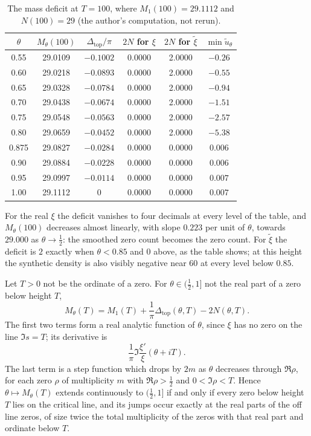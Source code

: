 \begin{table}[h]
\centering
\small
\begin{tabular}{cccccc}
\toprule
$\theta$ & $M_\theta(100)$ & $\Delta_{\mathrm{top}}/\pi$ & $2N$ for $\xi$ & $2N$ for $\tilde\xi$ & $\min\tilde u_\theta$\\
\midrule
0.55 & 29.0109 & $-0.1002$ & 0.0000 & 2.0000 & $-0.26$\\
0.60 & 29.0218 & $-0.0893$ & 0.0000 & 2.0000 & $-0.55$\\
0.65 & 29.0328 & $-0.0784$ & 0.0000 & 2.0000 & $-0.94$\\
0.70 & 29.0438 & $-0.0674$ & 0.0000 & 2.0000 & $-1.51$\\
0.75 & 29.0548 & $-0.0563$ & 0.0000 & 2.0000 & $-2.57$\\
0.80 & 29.0659 & $-0.0452$ & 0.0000 & 2.0000 & $-5.38$\\
0.875 & 29.0827 & $-0.0284$ & 0.0000 & 0.0000 & $0.006$\\
0.90 & 29.0884 & $-0.0228$ & 0.0000 & 0.0000 & $0.006$\\
0.95 & 29.0997 & $-0.0114$ & 0.0000 & 0.0000 & $0.007$\\
1.00 & 29.1112 & $0$ & 0.0000 & 0.0000 & $0.007$\\
\bottomrule
\end{tabular}
\caption{The mass deficit at $T=100$, where $M_1(100)=29.1112$ and $N(100)=29$ (the author's computation, not rerun).}\label{cx:tab:deficit}
\end{table}

For the real $\xi$ the deficit vanishes to four decimals at every level of the table, and $M_\theta(100)$ decreases almost linearly, with slope $0.223$ per unit of $\theta$, towards $29.000$ as $\theta\to\tfrac12$: the smoothed zero count becomes the zero count. For $\tilde\xi$ the deficit is $2$ exactly when $\theta<0.85$ and $0$ above, as the table shows; at this height the synthetic density is also visibly negative near $60$ at every level below $0.85$.

\begin{corollary}\label{cx:cor:levelmass}
Let $T>0$ not be the ordinate of a zero. For $\theta\in(\tfrac12,1]$ not the real part of a zero below height $T$,
\[
M_\theta(T)=M_1(T)+\frac1\pi\Delta_{\mathrm{top}}(\theta,T)-2N(\theta,T).
\]
The first two terms form a real analytic function of $\theta$, since $\xi$ has no zero on the line $\Im s=T$; its derivative is
\[
\frac1\pi\Im\frac{\xi'}{\xi}(\theta+iT).
\]
The last term is a step function which drops by $2m$ as $\theta$ decreases through $\Re\rho$, for each zero $\rho$ of multiplicity $m$ with $\Re\rho>\tfrac12$ and $0<\Im\rho<T$. Hence $\theta\mapsto M_\theta(T)$ extends continuously to $(\tfrac12,1]$ if and only if every zero below height $T$ lies on the critical line, and its jumps occur exactly at the real parts of the off line zeros, of size twice the total multiplicity of the zeros with that real part and ordinate below $T$.
\end{corollary}


